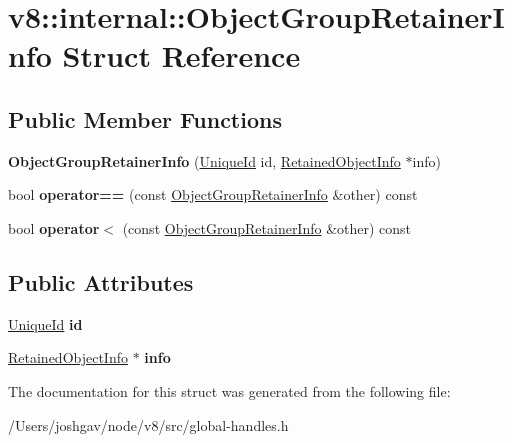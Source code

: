 \hypertarget{structv8_1_1internal_1_1_object_group_retainer_info}{}\section{v8\+:\+:internal\+:\+:Object\+Group\+Retainer\+Info Struct Reference}
\label{structv8_1_1internal_1_1_object_group_retainer_info}
\subsection*{Public Member Functions}
\begin{DoxyCompactItemize}
\item 
{\bfseries Object\+Group\+Retainer\+Info} (\hyperlink{classv8_1_1_unique_id}{Unique\+Id} id, \hyperlink{classv8_1_1_retained_object_info}{Retained\+Object\+Info} $\ast$info)\hypertarget{structv8_1_1internal_1_1_object_group_retainer_info_affe1484c03d628b2d44c5b6caef29eb5}{}\label{structv8_1_1internal_1_1_object_group_retainer_info_affe1484c03d628b2d44c5b6caef29eb5}

\item 
bool {\bfseries operator==} (const \hyperlink{structv8_1_1internal_1_1_object_group_retainer_info}{Object\+Group\+Retainer\+Info} \&other) const \hypertarget{structv8_1_1internal_1_1_object_group_retainer_info_a98c0d397f74c8245181d3264d7091b37}{}\label{structv8_1_1internal_1_1_object_group_retainer_info_a98c0d397f74c8245181d3264d7091b37}

\item 
bool {\bfseries operator$<$} (const \hyperlink{structv8_1_1internal_1_1_object_group_retainer_info}{Object\+Group\+Retainer\+Info} \&other) const \hypertarget{structv8_1_1internal_1_1_object_group_retainer_info_a0f34adbbd7459fbf50b5d647b73623f1}{}\label{structv8_1_1internal_1_1_object_group_retainer_info_a0f34adbbd7459fbf50b5d647b73623f1}

\end{DoxyCompactItemize}
\subsection*{Public Attributes}
\begin{DoxyCompactItemize}
\item 
\hyperlink{classv8_1_1_unique_id}{Unique\+Id} {\bfseries id}\hypertarget{structv8_1_1internal_1_1_object_group_retainer_info_a65a452da20b8166b0638de0a7e3e71f4}{}\label{structv8_1_1internal_1_1_object_group_retainer_info_a65a452da20b8166b0638de0a7e3e71f4}

\item 
\hyperlink{classv8_1_1_retained_object_info}{Retained\+Object\+Info} $\ast$ {\bfseries info}\hypertarget{structv8_1_1internal_1_1_object_group_retainer_info_a7476c3c666becd9545211a3fd5a0de2a}{}\label{structv8_1_1internal_1_1_object_group_retainer_info_a7476c3c666becd9545211a3fd5a0de2a}

\end{DoxyCompactItemize}


The documentation for this struct was generated from the following file\+:\begin{DoxyCompactItemize}
\item 
/\+Users/joshgav/node/v8/src/global-\/handles.\+h\end{DoxyCompactItemize}
